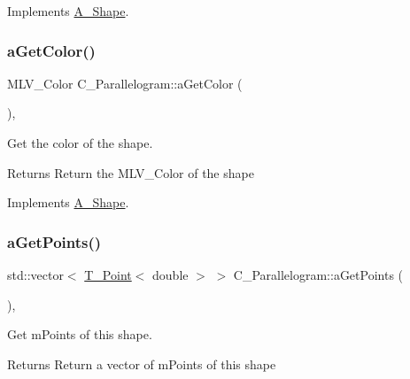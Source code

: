 Implements \hyperlink{classA__Shape_a1b142ee2d873d6c217f65de1632e7b6e}{A\+\_\+\+Shape}.

\mbox{\label{classC__Parallelogram_afd5055e948fcd992be3cdd227c8b4bfb}} 
\subsubsection{\texorpdfstring{a\+Get\+Color()}{aGetColor()}}
{\footnotesize\ttfamily M\+L\+V\+\_\+\+Color C\+\_\+\+Parallelogram\+::a\+Get\+Color (\begin{DoxyParamCaption}{ }\end{DoxyParamCaption})\hspace{0.3cm}{\ttfamily [override]}, {\ttfamily [virtual]}}



Get the color of the shape. 

\begin{DoxyReturn}{Returns}
Return the M\+L\+V\+\_\+\+Color of the shape 
\end{DoxyReturn}


Implements \hyperlink{classA__Shape_a1e90c8132d33e4ac84d42f72606193b2}{A\+\_\+\+Shape}.

\mbox{\label{classC__Parallelogram_ae75f316315134020e8423feff917828e}} 
\subsubsection{\texorpdfstring{a\+Get\+Points()}{aGetPoints()}}
{\footnotesize\ttfamily std\+::vector$<$ \hyperlink{classT__Point}{T\+\_\+\+Point}$<$ double $>$ $>$ C\+\_\+\+Parallelogram\+::a\+Get\+Points (\begin{DoxyParamCaption}{ }\end{DoxyParamCaption})\hspace{0.3cm}{\ttfamily [override]}, {\ttfamily [virtual]}}



Get m\+Points of this shape. 

\begin{DoxyReturn}{Returns}
Return a vector of m\+Points of this shape 
\end{DoxyReturn}


